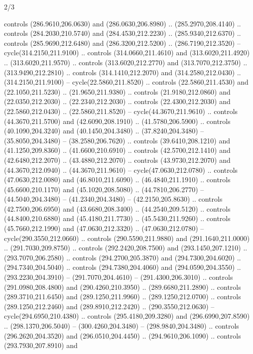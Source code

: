 \begin{flagdescription}{2/3}
\begin{scope}[xshift=0.5\flaglength,yshift=0.5\flagwidth,scale=\stretchfactor]
\begin{scope}[scale=0.001645\flagwidth,yshift=65mm,xshift=-63mm]
\begin{scope}[y=0.80pt, x=0.80pt, yscale=-1,]
\begin{scope}[cm={{1.33333,0.0,0.0,1.33333,(0.0,1e-05)}}]
  controls (286.9610,206.0630) and (286.0630,206.8980) .. (285.2970,208.4140) ..
  controls (284.2030,210.5740) and (284.4530,212.2230) .. (285.9340,212.6370) ..
  controls (285.9690,212.6480) and (286.3200,212.5200) .. (286.7190,212.3520) --
  cycle(314.2150,211.9100) .. controls (314.0660,211.4610) and
  (313.6020,211.4920) .. (313.6020,211.9570) .. controls (313.6020,212.2770) and
  (313.7070,212.3750) .. (313.9490,212.2810) .. controls (314.1410,212.2070) and
  (314.2580,212.0430) .. (314.2150,211.9100) -- cycle(22.5860,211.8520) ..
  controls (22.5860,211.4530) and (22.1050,211.5230) .. (21.9650,211.9380) ..
  controls (21.9180,212.0860) and (22.0350,212.2030) .. (22.2340,212.2030) ..
  controls (22.4300,212.2030) and (22.5860,212.0430) .. (22.5860,211.8520) --
  cycle(44.3670,211.9610) .. controls (44.3670,211.5700) and (42.6090,208.1910)
  .. (41.5780,206.5900) .. controls (40.1090,204.3240) and (40.1450,204.3480) ..
  (37.8240,204.3480) -- (35.8050,204.3480) -- (38.2580,206.7620) .. controls
  (39.6410,208.1210) and (41.1250,209.8360) .. (41.6600,210.6910) .. controls
  (42.5700,212.1410) and (42.6480,212.2070) .. (43.4880,212.2070) .. controls
  (43.9730,212.2070) and (44.3670,212.0940) .. (44.3670,211.9610) --
  cycle(47.0630,212.0780) .. controls (47.0630,212.0080) and (46.8010,211.6090)
  .. (46.4840,211.1910) .. controls (45.6600,210.1170) and (45.1020,208.5080) ..
  (44.7810,206.2770) -- (44.5040,204.3480) -- (41.2340,204.3480) --
  (42.2150,205.8630) .. controls (42.7500,206.6950) and (43.6680,208.3400) ..
  (44.2540,209.5120) .. controls (44.8400,210.6880) and (45.4180,211.7730) ..
  (45.5430,211.9260) .. controls (45.7660,212.1990) and (47.0630,212.3320) ..
  (47.0630,212.0780) -- cycle(290.3550,212.0660) .. controls (290.5590,211.9880)
  and (291.1640,211.0000) .. (291.7030,209.8750) .. controls (292.2420,208.7500)
  and (293.1450,207.1210) .. (293.7070,206.2580) .. controls (294.2700,205.3870)
  and (294.7300,204.6020) .. (294.7340,204.5040) .. controls (294.7380,204.4060)
  and (294.0590,204.3550) .. (293.2230,204.3910) -- (291.7070,204.4610) --
  (291.4300,206.3010) .. controls (291.0980,208.4800) and (290.4260,210.3950) ..
  (289.6680,211.2890) .. controls (289.3710,211.6450) and (289.1250,211.9960) ..
  (289.1250,212.0700) .. controls (289.1250,212.2460) and (289.8910,212.2420) ..
  (290.3550,212.0630) -- cycle(294.6950,210.4380) .. controls
  (295.4180,209.3280) and (296.6990,207.8590) .. (298.1370,206.5040) --
  (300.4260,204.3480) -- (298.9840,204.3480) .. controls (296.2620,204.3520) and
  (296.0510,204.4450) .. (294.9610,206.1090) .. controls (293.7930,207.8910) and

\end{scope}
\end{scope}
\end{scope}
\end{scope}
\end{flagdescription}
